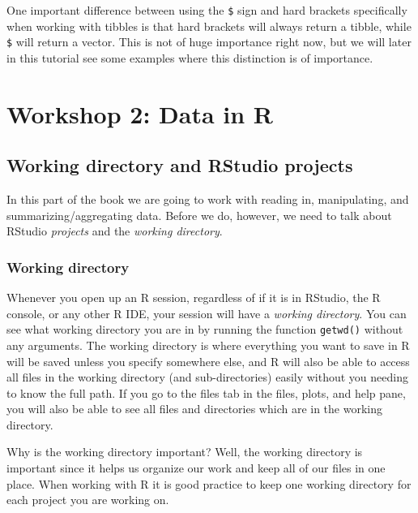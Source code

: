 \documentclass[
]{book}
\begin{document}
One important difference between using the \texttt{\$} sign and hard brackets specifically when working with tibbles is that hard brackets will always return a tibble, while \texttt{\$} will return a vector. This is not of huge importance right now, but we will later in this tutorial see some examples where this distinction is of importance.

\hypertarget{part-workshop-2-data-in-r}{%
\part{Workshop 2: Data in R}\label{part-workshop-2-data-in-r}}

\hypertarget{working-directory-and-rstudio-projects}{%
\chapter{Working directory and RStudio projects}\label{working-directory-and-rstudio-projects}}

In this part of the book we are going to work with reading in, manipulating, and summarizing/aggregating data. Before we do, however, we need to talk about RStudio \emph{projects} and the \emph{working directory}.

\hypertarget{working-directory}{%
\section{Working directory}\label{working-directory}}

Whenever you open up an R session, regardless of if it is in RStudio, the R console, or any other R IDE, your session will have a \emph{working directory}. You can see what working directory you are in by running the function \texttt{getwd()} without any arguments. The working directory is where everything you want to save in R will be saved unless you specify somewhere else, and R will also be able to access all files in the working directory (and sub-directories) easily without you needing to know the full path. If you go to the files tab in the files, plots, and help pane, you will also be able to see all files and directories which are in the working directory.

Why is the working directory important? Well, the working directory is important since it helps us organize our work and keep all of our files in one place. When working with R it is good practice to keep one working directory for each project you are working on.
\end{document}
